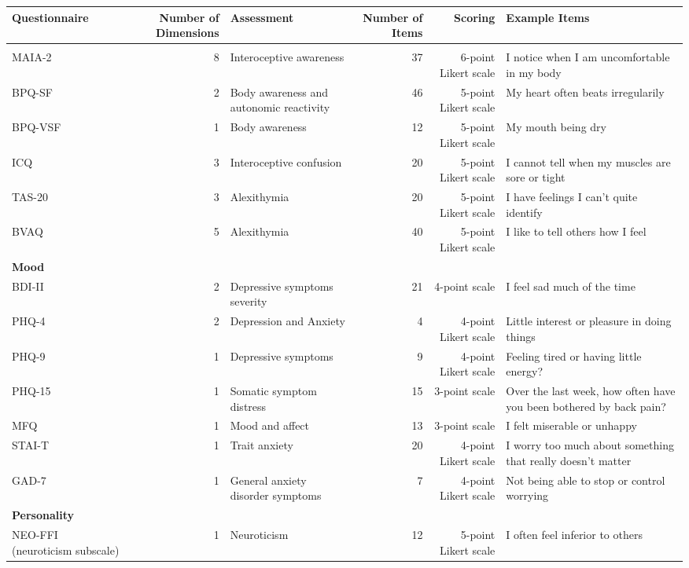 \begin{table}
\fontsize{6.8pt}{8.1pt}\selectfont
\begin{tabular*}{\linewidth}{@{\extracolsep{\fill}}lrlrrl}
\toprule
Questionnaire & Number of Dimensions & Assessment & Number of Items & Scoring & Example Items \\ 
\midrule\addlinespace[2.5pt]
{\bfseries Interoceptive Related} &  &  &  &  &  \\ 
MAIA-2 & 8 & Interoceptive awareness & 37 & 6-point Likert scale & I notice when I am uncomfortable in my body \\ 
BPQ-SF & 2 & Body awareness and autonomic reactivity & 46 & 5-point Likert scale & My heart often beats irregularily \\ 
BPQ-VSF & 1 & Body awareness & 12 & 5-point Likert scale & My mouth being dry \\ 
ICQ & 3 & Interoceptive confusion & 20 & 5-point Likert scale &  I cannot tell when my muscles are sore or tight \\ 
TAS-20 & 3 & Alexithymia & 20 & 5-point Likert scale & I have feelings I can't quite identify \\ 
BVAQ & 5 & Alexithymia & 40 & 5-point Likert scale & I like to tell others how I feel \\ 
{\bfseries Mood} &  &  &  &  &  \\ 
BDI-II & 2 & Depressive symptoms severity & 21 & 4-point scale & I feel sad much of the time \\ 
PHQ-4 & 2 & Depression and Anxiety & 4 & 4-point Likert scale & Little interest or pleasure in doing things \\ 
PHQ-9 & 1 & Depressive symptoms & 9 & 4-point Likert scale & Feeling tired or having little energy? \\ 
PHQ-15 & 1 & Somatic symptom distress & 15 & 3-point scale & Over the last week, how often have you been bothered by back pain? \\ 
MFQ & 1 & Mood and affect & 13 & 3-point scale & I felt miserable or unhappy \\ 
STAI-T & 1 & Trait anxiety & 20 & 4-point Likert scale & I worry too much about something that really doesn't matter \\ 
GAD-7 & 1 & General anxiety disorder symptoms & 7 & 4-point Likert scale & Not being able to stop or control worrying \\ 
{\bfseries Personality} &  &  &  &  &  \\ 
NEO-FFI (neuroticism subscale) & 1 & Neuroticism & 12 & 5-point Likert scale & I often feel inferior to others \\ 

\end{tabular*}
\end{table}

